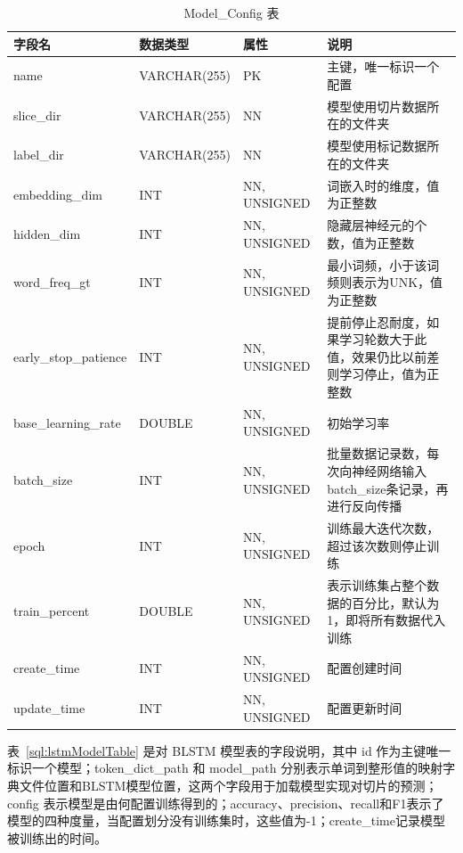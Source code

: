 \begin{table}[!htbp]\footnotesize %
	\centering
	\caption{Model\_Config 表}
	\vspace{2mm}
	\begin{tabular}{L{2.2cm}L{2cm}L{2.6cm}L{6cm}}
		\toprule
		\textbf{字段名}&\textbf{数据类型}&\textbf{属性}&\textbf{说明}\\
		\midrule
		name 						&VARCHAR(255)&PK&主键，唯一标识一个配置\\
		slice\_dir		 			&VARCHAR(255)&NN&模型使用切片数据所在的文件夹\\
		label\_dir		 			&VARCHAR(255)&NN&模型使用标记数据所在的文件夹\\
		embedding\_dim		  &INT&NN, UNSIGNED&词嵌入时的维度，值为正整数\\
		hidden\_dim				&INT&NN, UNSIGNED&隐藏层神经元的个数，值为正整数\\
		word\_freq\_gt			&INT&NN, UNSIGNED&最小词频，小于该词频则表示为UNK，值为正整数\\
		early\_stop\_patience		&INT&NN, UNSIGNED&提前停止忍耐度，如果学习轮数大于此值，效果仍比以前差则学习停止，值为正整数\\
		base\_learning\_rate		&DOUBLE&NN, UNSIGNED&初始学习率\\
		batch\_size					&INT&NN, UNSIGNED&批量数据记录数，每次向神经网络输入batch\_size条记录，再进行反向传播\\
		epoch						&INT&NN, UNSIGNED&训练最大迭代次数，超过该次数则停止训练\\
		train\_percent						&DOUBLE&NN, UNSIGNED&表示训练集占整个数据的百分比，默认为1，即将所有数据代入训练\\
		create\_time				&INT&NN, UNSIGNED&配置创建时间\\
		update\_time				&INT&NN, UNSIGNED&配置更新时间\\
		\bottomrule
	\end{tabular}
	\label{sql:modelConfigTable}
\end{table}

表~\ref{sql:lstmModelTable} 是对 BLSTM 模型表的字段说明，其中 id 作为主键唯一标识一个模型；token\_dict\_path 和 model\_path 分别表示单词到整形值的映射字典文件位置和BLSTM模型位置，这两个字段用于加载模型实现对切片的预测；config 表示模型是由何配置训练得到的；accuracy、precision、recall和F1表示了模型的四种度量，当配置划分没有训练集时，这些值为-1；create\_time记录模型被训练出的时间。

